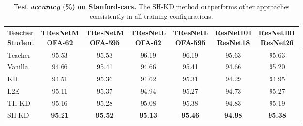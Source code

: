 \begin{table*}[t!]
\setlength{\tabcolsep}{3pt}
\begin{center}
\begin{tabular}{|l||c|c|c|c|c|c|}
\hline
\thead{Teacher \\Student} & \thead{TResNetM\\OFA-62} & \thead{TResNetM\\OFA-595} & \thead{TResNetL\\OFA-62} & \thead{TResNetL\\OFA-595} & \thead{ResNet101\\ResNet18} & \thead{ResNet101\\ResNet26} \\
\hline
Teacher & 95.53 &  95.53 & 96.19 & 96.19 & 95.63 & 95.63 \\
\hline
Vanilla & 94.66 & 95.41 & 94.66 & 95.41 & 94.66 & 95.20 \\
KD & 94.51 & 95.36 & 94.62 & 95.31 & 94.29 & 94.95 \\
L2E & 95.11 & 95.37 & 94.94 & 95.27 & 94.73 & 95.27 \\
TH-KD & 95.16 & 95.28 & 95.08 & 95.38 & 94.83 & 95.19 \\
SH-KD & \textbf{95.21}& \textbf{95.52} & \textbf{95.13} & \textbf{95.46} & \textbf{94.98} & \textbf{95.38} \\
\hline
\end{tabular}
\vspace{1pt}
\caption{\textbf{Test \emph{accuracy} (\%) on Stanford-cars.} The SH-KD method outperforms other approaches  consistently in all training configurations.}
\label{tbl:stanford_cars}
\end{center}
\vspace{-20pt}
\end{table*}



